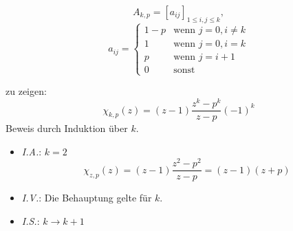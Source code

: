 \begin{flushenum}
\item
  \[ A_{k,p} = \left[a_{ij}\right]_{1\leq i,j\leq k}, \]
  \[ a_{ij} = \begin{cases} 1-p &\text{wenn~} j = 0, i \not= k \\
                              1 &\text{wenn~} j = 0, i = k \\
                              p &\text{wenn~} j = i + 1 \\
                              0 &\text{sonst} \end{cases} \]

  zu zeigen: \[ \chi_{k,p}(z) = (z - 1) \frac{z^{k}-p^{k}}{z-p}(-1)^{k} \]
  Beweis durch Induktion über $k$.
  \begin{itemize}
    \item \textit{I.A.}: $k = 2$
      \[ \chi_{z,p}(z) = (z - 1) \frac{z^{2}-p^{2}}{z-p} = (z-1)(z+p) \]
    \item \textit{I.V.}: Die Behauptung gelte für $k$.
    \item \textit{I.S.}: $k \rightarrow k + 1$


\end{itemize}
\end{flushenum}
